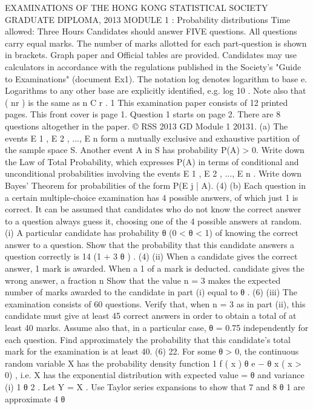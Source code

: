 EXAMINATIONS OF THE HONG KONG STATISTICAL SOCIETY
GRADUATE DIPLOMA, 2013
MODULE 1 : Probability distributions
Time allowed: Three Hours
Candidates should answer FIVE questions.
All questions carry equal marks.
The number of marks allotted for each part-question is shown in brackets.
Graph paper and Official tables are provided.
Candidates may use calculators in accordance with the regulations published in
the Society's "Guide to Examinations" (document Ex1).
The notation log denotes logarithm to base e.
Logarithms to any other base are explicitly identified, e.g. log 10 .
Note also that
( nr ) is the same as
n
C r .
1
This examination paper consists of 12 printed pages.
This front cover is page 1.
Question 1 starts on page 2.
There are 8 questions altogether in the paper.
© RSS 2013
GD Module 1 20131.
(a) The events E 1 , E 2 , ..., E n form a mutually exclusive and exhaustive partition
of the sample space S. Another event A in S has probability P(A) > 0. Write
down the Law of Total Probability, which expresses P(A) in terms of
conditional and unconditional probabilities involving the events E 1 , E 2 , ..., E n .
Write down Bayes' Theorem for probabilities of the form P(E j | A).
(4)
(b) Each question in a certain multiple-choice examination has 4 possible answers,
of which just 1 is correct. It can be assumed that candidates who do not know
the correct answer to a question always guess it, choosing one of the 4 possible
answers at random.
(i)
A particular candidate has probability θ (0 < θ < 1) of knowing the
correct answer to a question. Show that the probability that this
candidate answers a question correctly is 14 (1 + 3 θ ) .
(4)
(ii) When a candidate gives the correct answer, 1 mark is awarded. When a
1
of a mark is deducted.
candidate gives the wrong answer, a fraction
n
Show that the value n = 3 makes the expected number of marks
awarded to the candidate in part (i) equal to θ .
(6)
(iii) The examination consists of 60 questions. Verify that, when n = 3 as in
part (ii), this candidate must give at least 45 correct answers in order to
obtain a total of at least 40 marks.
Assume also that, in a particular case, θ = 0.75 independently for each
question. Find approximately the probability that this candidate's total
mark for the examination is at least 40.
(6)
22.
For some θ > 0, the continuous random variable X has the probability density function
1
f ( x ) θ e − θ x ( x > 0) , i.e. X has the exponential distribution with expected value
=
θ
and variance
(i)
1
θ 2
. Let Y =
X .
Use Taylor series expansions to show that
7
and
8 θ
1
are approximate
4 θ
